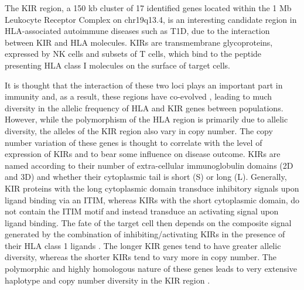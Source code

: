 The \gls{KIR} region, a 150 kb cluster of 17 identified genes located within the 1 Mb Leukocyte Receptor Complex on chr19q13.4,
is an interesting candidate region in HLA-associated autoimmune diseases such as \gls{T1D}, due to the interaction between \gls{KIR} and \gls{HLA} molecules.
\Glspl{KIR} are transmembrane glycoproteins, expressed by \gls{NK} cells and subsets of T cells,
which bind to the peptide presenting HLA class I molecules on the surface of target cells.

It is thought that the interaction of these two loci plays an important part in immunity and, as a result, these regions have co-evolved \citep{Parham:2013eb},
leading to much diversity in the allelic frequency of HLA and KIR genes between populations.
However, while the polymorphism of the HLA region is primarily due to allelic diversity, 
the alleles of the \gls{KIR} region also vary in copy number.
The copy number variation of these genes is thought to correlate with the level of expression of \glspl{KIR} and to bear some influence on disease outcome.
\Glspl{KIR} are named according to their number of extra-cellular immunoglobulin domains (2D and 3D) and whether their cytoplasmic tail is short (S) or long (L).  
Generally, KIR proteins with the long cytoplasmic domain transduce inhibitory signals upon ligand binding via an \gls{ITIM},
whereas KIRs with the short cytoplasmic domain, do not contain the \gls{ITIM} motif and instead transduce an activating signal upon ligand binding.  
The fate of the target cell then depends on the composite signal generated by the combination of inhibiting/activating KIRs in the presence of their HLA class 1 ligands \citep{Bashirova:2006dj}.
The longer KIR genes tend to have greater allelic diversity, whereas the shorter KIRs tend to vary more in copy number.
The polymorphic and highly homologous nature of these genes leads to very extensive haplotype and copy number diversity in the KIR region \citep{Jiang:2012cf}.

